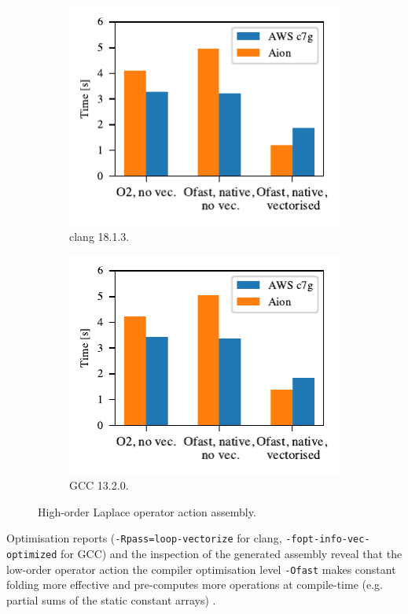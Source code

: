 \begin{figure}
    \begin{subfigure}{.5\textwidth}
        \centering
        \includegraphics{chapters/chp1/graphics/kernel_plots/local_operator_clang_deg8.pdf}
        \caption{clang 18.1.3.}
        \label{fig:local-clang-deg8}
    \end{subfigure}%
    \begin{subfigure}{.5\textwidth}
        \centering
        \includegraphics{chapters/chp1/graphics/kernel_plots/local_operator_gcc_deg8.pdf}
        \caption{GCC 13.2.0.}
        \label{fig:local-gcc-deg8}
    \end{subfigure}
    \caption{High-order Laplace operator action assembly.}
    \label{fig:local-deg8}
\end{figure}

Optimisation reports (\texttt{-Rpass=loop-vectorize} for clang,
\texttt{-fopt-info-vec-optimized} for GCC) and the inspection of the generated
assembly reveal that the low-order operator action the compiler optimisation
level \lstinline{-Ofast} makes constant folding more effective and pre-computes
more operations at compile-time (e.g. partial sums of the static constant arrays)
\citep{GodboltArmClangDeg1}.

